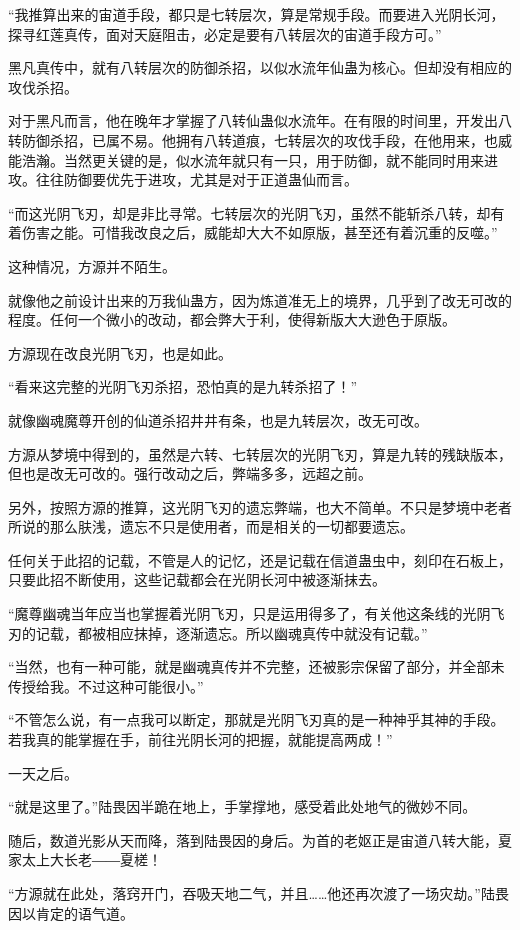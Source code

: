 \begin{this_body}
“我推算出来的宙道手段，都只是七转层次，算是常规手段。而要进入光阴长河，探寻红莲真传，面对天庭阻击，必定是要有八转层次的宙道手段方可。”

黑凡真传中，就有八转层次的防御杀招，以似水流年仙蛊为核心。但却没有相应的攻伐杀招。

对于黑凡而言，他在晚年才掌握了八转仙蛊似水流年。在有限的时间里，开发出八转防御杀招，已属不易。他拥有八转道痕，七转层次的攻伐手段，在他用来，也威能浩瀚。当然更关键的是，似水流年就只有一只，用于防御，就不能同时用来进攻。往往防御要优先于进攻，尤其是对于正道蛊仙而言。

“而这光阴飞刃，却是非比寻常。七转层次的光阴飞刃，虽然不能斩杀八转，却有着伤害之能。可惜我改良之后，威能却大大不如原版，甚至还有着沉重的反噬。”

这种情况，方源并不陌生。

就像他之前设计出来的万我仙蛊方，因为炼道准无上的境界，几乎到了改无可改的程度。任何一个微小的改动，都会弊大于利，使得新版大大逊色于原版。

方源现在改良光阴飞刃，也是如此。

“看来这完整的光阴飞刃杀招，恐怕真的是九转杀招了！”

就像幽魂魔尊开创的仙道杀招井井有条，也是九转层次，改无可改。

方源从梦境中得到的，虽然是六转、七转层次的光阴飞刃，算是九转的残缺版本，但也是改无可改的。强行改动之后，弊端多多，远超之前。

另外，按照方源的推算，这光阴飞刃的遗忘弊端，也大不简单。不只是梦境中老者所说的那么肤浅，遗忘不只是使用者，而是相关的一切都要遗忘。

任何关于此招的记载，不管是人的记忆，还是记载在信道蛊虫中，刻印在石板上，只要此招不断使用，这些记载都会在光阴长河中被逐渐抹去。

“魔尊幽魂当年应当也掌握着光阴飞刃，只是运用得多了，有关他这条线的光阴飞刃的记载，都被相应抹掉，逐渐遗忘。所以幽魂真传中就没有记载。”

“当然，也有一种可能，就是幽魂真传并不完整，还被影宗保留了部分，并全部未传授给我。不过这种可能很小。”

“不管怎么说，有一点我可以断定，那就是光阴飞刃真的是一种神乎其神的手段。若我真的能掌握在手，前往光阴长河的把握，就能提高两成！”

一天之后。

“就是这里了。”陆畏因半跪在地上，手掌撑地，感受着此处地气的微妙不同。

随后，数道光影从天而降，落到陆畏因的身后。为首的老妪正是宙道八转大能，夏家太上大长老――夏槎！

“方源就在此处，落窍开门，吞吸天地二气，并且……他还再次渡了一场灾劫。”陆畏因以肯定的语气道。


\end{this_body}
